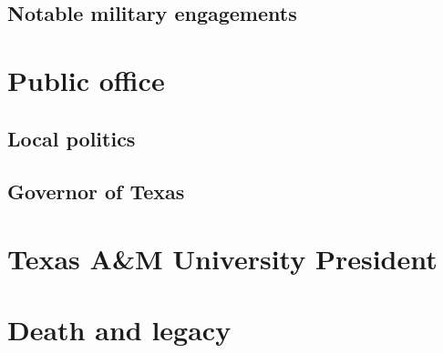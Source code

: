 \documentclass[12pt]{article}
\begin{document}
\subsection{Notable military engagements}

\newpage
\section{Public office}

\subsection{Local politics}

\subsection{Governor of Texas}

\newpage
\section{Texas A\&M University President}

\newpage
\section{Death and legacy}

\newpage
\printbibliography

\end{document}
